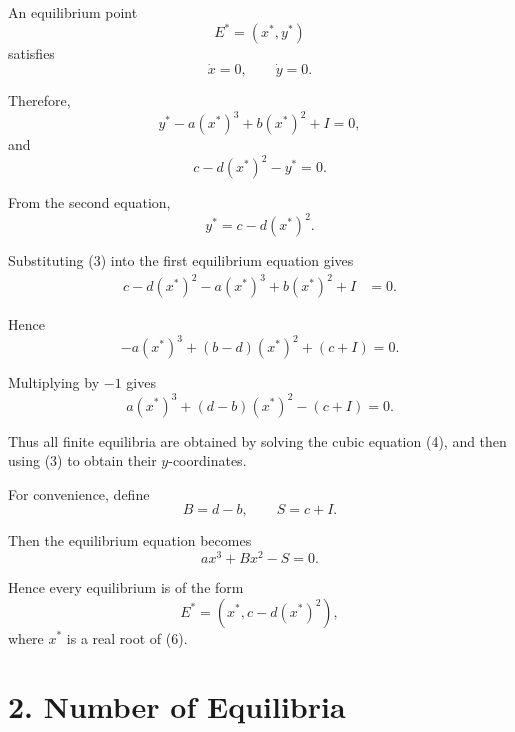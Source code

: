 \documentclass[11pt,a4paper]{article}
\begin{document}
An equilibrium point
\begin{equation}
E^*=(x^*,y^*)
\end{equation}
satisfies
\begin{equation}
\dot{x}=0,
\qquad
\dot{y}=0.
\end{equation}

Therefore,
\begin{equation}
y^*-a(x^*)^3+b(x^*)^2+I=0,
\tag{1}
\end{equation}
and
\begin{equation}
c-d(x^*)^2-y^*=0.
\tag{2}
\end{equation}

From the second equation,
\begin{equation}
\boxed{
y^*=c-d(x^*)^2.
}
\tag{3}
\end{equation}

Substituting (3) into the first equilibrium equation gives
\begin{align}
c-d(x^*)^2-a(x^*)^3+b(x^*)^2+I
&=0.
\end{align}

Hence
\begin{equation}
-a(x^*)^3+(b-d)(x^*)^2+(c+I)=0.
\end{equation}

Multiplying by $-1$ gives
\begin{equation}
\boxed{
a(x^*)^3+(d-b)(x^*)^2-(c+I)=0.
}
\tag{4}
\end{equation}

Thus all finite equilibria are obtained by solving the cubic
equation (4), and then using (3) to obtain their $y$-coordinates.

For convenience, define
\begin{equation}
\boxed{
B=d-b,
\qquad
S=c+I.
}
\tag{5}
\end{equation}

Then the equilibrium equation becomes
\begin{equation}
\boxed{
a x^3+B x^2-S=0.
}
\tag{6}
\end{equation}

Hence every equilibrium is of the form
\begin{equation}
\boxed{
E^*=
\left(
x^*,
c-d(x^*)^2
\right),
}
\tag{7}
\end{equation}
where $x^*$ is a real root of (6).

\section{2. Number of Equilibria}
\end{document}
